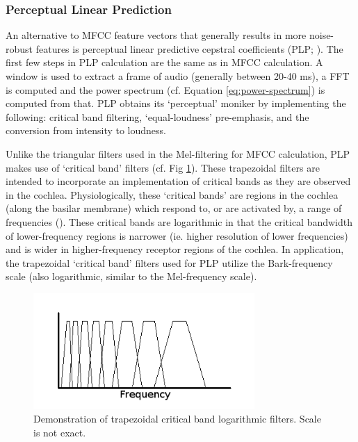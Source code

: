 \subsubsection{Perceptual Linear Prediction}\label{sec:plp}

An alternative to MFCC feature vectors that generally results in more noise-robust features is perceptual linear predictive cepstral coefficients (PLP; \cite{hermansky:85}).  The first few steps in PLP calculation are the same as in MFCC calculation.  A window is used to extract a frame of audio (generally between 20-40 ms), a FFT is computed and the power spectrum (cf. Equation \ref{eq:power-spectrum}) is computed from that.  PLP obtains its `perceptual' moniker by implementing the following: critical band filtering, `equal-loudness' pre-emphasis, and the conversion from intensity to loudness.  

Unlike the triangular filters used in the Mel-filtering for MFCC calculation, PLP makes use of `critical band' filters (cf. Fig \ref{fig:filt-cb}).  These trapezoidal filters are intended to incorporate an implementation of critical bands as they are observed in the cochlea. Physiologically, these `critical bands' are regions in the cochlea (along the basilar membrane) which respond to, or are activated by, a range of frequencies (\cite{fletcher:40}).  These critical bands are logarithmic in that the critical bandwidth of lower-frequency regions is narrower (ie. higher resolution of lower frequencies) and is wider in higher-frequency receptor regions of the cochlea.  In application, the trapezoidal `critical band' filters used for PLP utilize the Bark-frequency scale (also logarithmic, similar to the Mel-frequency scale).

\begin{figure}[h]
\centering
\includegraphics[width=0.75\textwidth]{figure/filt-cb.png}
\caption{Demonstration of trapezoidal critical band logarithmic filters. Scale is not exact.}\label{fig:filt-cb}
\end{figure}

